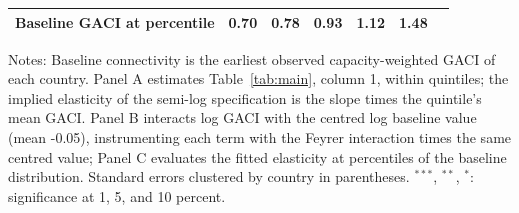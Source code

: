 \documentclass[12pt]{article}
\begin{document}
\begin{table}[htbp]
\begin{threeparttable}
\begin{tabular}{lcccccc}
  Baseline GACI at percentile & 0.70 & 0.78 & 0.93 & 1.12 & 1.48 & \\
\bottomrule
\end{tabular}
\begin{tablenotes}[flushleft]
\footnotesize
\item Notes: Baseline connectivity is the earliest observed capacity-weighted GACI of each country. Panel A estimates Table~\ref{tab:main}, column 1, within quintiles; the implied elasticity of the semi-log specification is the slope times the quintile's mean GACI. Panel B interacts log GACI with the centred log baseline value (mean -0.05), instrumenting each term with the Feyrer interaction times the same centred value; Panel C evaluates the fitted elasticity at percentiles of the baseline distribution. Standard errors clustered by country in parentheses. $^{***}$, $^{**}$, $^{*}$: significance at 1, 5, and 10 percent.
\end{tablenotes}
\end{threeparttable}
\end{table}
\end{document}
